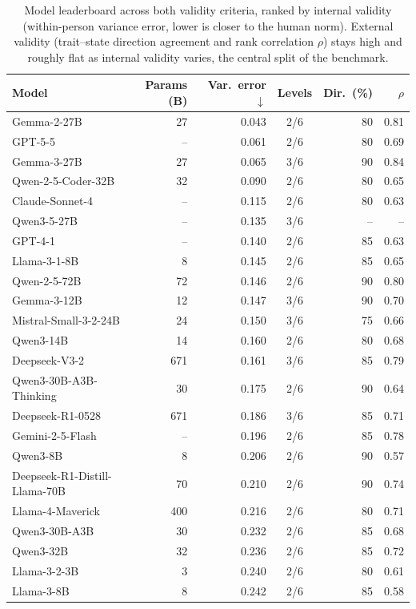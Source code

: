 \begin{table}[t]
\centering\footnotesize
\caption{Model leaderboard across both validity criteria, ranked by internal validity (within-person variance error, lower is closer to the human norm). External validity (trait--state direction agreement and rank correlation $\rho$) stays high and roughly flat as internal validity varies, the central split of the benchmark.}
\label{app:leaderboard}
\begin{tabular}{l r r c r r}
\toprule
Model & Params (B) & Var.\ error $\downarrow$ & Levels & Dir.\ (\%) & $\rho$ \\
\midrule
Gemma-2-27B & 27 & 0.043 & 2/6 & 80 & 0.81 \\
GPT-5-5 & -- & 0.061 & 2/6 & 80 & 0.69 \\
Gemma-3-27B & 27 & 0.065 & 3/6 & 90 & 0.84 \\
Qwen-2-5-Coder-32B & 32 & 0.090 & 2/6 & 80 & 0.65 \\
Claude-Sonnet-4 & -- & 0.115 & 2/6 & 80 & 0.63 \\
Qwen3-5-27B & -- & 0.135 & 3/6 & -- & -- \\
GPT-4-1 & -- & 0.140 & 2/6 & 85 & 0.63 \\
Llama-3-1-8B & 8 & 0.145 & 2/6 & 85 & 0.65 \\
Qwen-2-5-72B & 72 & 0.146 & 2/6 & 90 & 0.80 \\
Gemma-3-12B & 12 & 0.147 & 3/6 & 90 & 0.70 \\
Mistral-Small-3-2-24B & 24 & 0.150 & 3/6 & 75 & 0.66 \\
Qwen3-14B & 14 & 0.160 & 2/6 & 80 & 0.68 \\
Deepseek-V3-2 & 671 & 0.161 & 3/6 & 85 & 0.79 \\
Qwen3-30B-A3B-Thinking & 30 & 0.175 & 2/6 & 90 & 0.64 \\
Deepseek-R1-0528 & 671 & 0.186 & 3/6 & 85 & 0.71 \\
Gemini-2-5-Flash & -- & 0.196 & 2/6 & 85 & 0.78 \\
Qwen3-8B & 8 & 0.206 & 2/6 & 90 & 0.57 \\
Deepseek-R1-Distill-Llama-70B & 70 & 0.210 & 2/6 & 90 & 0.74 \\
Llama-4-Maverick & 400 & 0.216 & 2/6 & 80 & 0.71 \\
Qwen3-30B-A3B & 30 & 0.232 & 2/6 & 85 & 0.68 \\
Qwen3-32B & 32 & 0.236 & 2/6 & 85 & 0.72 \\
Llama-3-2-3B & 3 & 0.240 & 2/6 & 80 & 0.61 \\
Llama-3-8B & 8 & 0.242 & 2/6 & 85 & 0.58 \\

\end{tabular}
\end{table}

